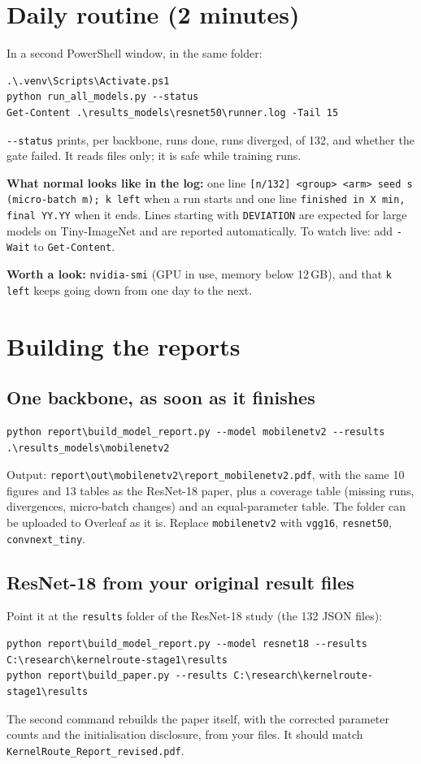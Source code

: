 \documentclass[10.5pt,a4paper]{article}
\newcommand{\cmd}[1]{\texttt{#1}}
\begin{document}
\section{Daily routine (2 minutes)}\label{sec:daily}

In a second PowerShell window, in the same folder:
\begin{lstlisting}
.\.venv\Scripts\Activate.ps1
python run_all_models.py --status
Get-Content .\results_models\resnet50\runner.log -Tail 15
\end{lstlisting}
\cmd{-{}-status} prints, per backbone, runs done, runs diverged, of 132, and whether the gate failed. It reads files only; it is safe while training runs.

\textbf{What normal looks like in the log:} one line \cmd{[n/132] <group> <arm> seed s (micro-batch m); k left} when a run starts and one line \cmd{finished in X min, final YY.YY} when it ends. Lines starting with \cmd{DEVIATION} are expected for large models on Tiny-ImageNet and are reported automatically. To watch live: add \cmd{-Wait} to \cmd{Get-Content}.

\textbf{Worth a look:} \cmd{nvidia-smi} (GPU in use, memory below 12\,GB), and that \cmd{k left} keeps going down from one day to the next.

\section{Building the reports}\label{sec:reports}

\subsection{One backbone, as soon as it finishes}
\begin{lstlisting}
python report\build_model_report.py --model mobilenetv2 --results .\results_models\mobilenetv2
\end{lstlisting}
Output: \cmd{report\textbackslash out\textbackslash mobilenetv2\textbackslash report\_mobilenetv2.pdf}, with the same 10 figures and 13 tables as the ResNet-18 paper, plus a coverage table (missing runs, divergences, micro-batch changes) and an equal-parameter table. The folder can be uploaded to Overleaf as it is. Replace \cmd{mobilenetv2} with \cmd{vgg16}, \cmd{resnet50}, \cmd{convnext\_tiny}.

\subsection{ResNet-18 from your original result files}
Point it at the \cmd{results} folder of the ResNet-18 study (the 132 JSON files):
\begin{lstlisting}
python report\build_model_report.py --model resnet18 --results C:\research\kernelroute-stage1\results
python report\build_paper.py --results C:\research\kernelroute-stage1\results
\end{lstlisting}
The second command rebuilds the paper itself, with the corrected parameter counts and the initialisation disclosure, from your files. It should match \cmd{KernelRoute\_Report\_revised.pdf}.
\end{document}
